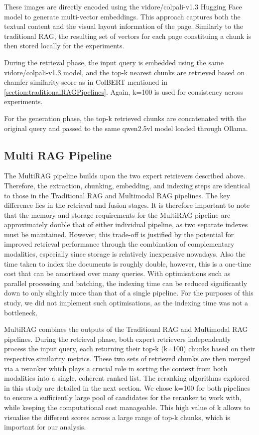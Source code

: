 \documentclass[12pt,twoside]{report}
\begin{document}
These images are directly encoded using the vidore/colpali-v1.3 Hugging Face model to generate multi-vector embeddings.\cite{VidoreColPali} This approach captures both the textual content and the visual layout information of the page. Similarly to the traditional RAG, the resulting set of vectors for each page constituing a chunk is then stored locally for the experiments.

During the retrieval phase, the input query is embedded using the same vidore/colpali-v1.3 model, and the top-k nearest chunks are retrieved based on chamfer similarity score as in ColBERT mentioned in \ref{section:traditionalRAGPipelines}.
Again, k=100 is used for consistency across experiments.

For the generation phase, the top-k retrieved chunks are concatenated with the original query and passed to the same qwen2.5vl model loaded through Ollama.

\subsection{Multi RAG Pipeline}

The MultiRAG pipeline builds upon the two expert retrievers described above. Therefore, the extraction, chunking, embedding, and indexing steps are identical to those in the Traditional RAG and Multimodal RAG pipelines. The key difference lies in the retrieval and fusion stages. It is therefore important to note that the memory and storage requirements for the MultiRAG pipeline are approximately double that of either individual pipeline, as two separate indexes must be maintained. However, this trade-off is justified by the potential for improved retrieval performance through the combination of complementary modalities, especially since storage is relatively inexpensive nowadays. Also the time taken to index the documents is roughly double, however, this is a one-time cost that can be amortised over many queries. With optimisations such as parallel processing and batching, the indexing time can be reduced significantly down to only slightly more than that of a single pipeline. For the purposes of this study, we did not implement such optimisations, as the indexing time was not a bottleneck.

MultiRAG combines the outputs of the Traditional RAG and Multimodal RAG pipelines. During the retrieval phase, both expert retrievers independently process the input query, each returning their top-k (k=100) chunks based on their respective similarity metrics. These two sets of retrieved chunks are then merged via a reranker which plays a crucial role in sorting the context from both modalities into a single, coherent ranked list. The reranking algorithms explored in this study are detailed in the next section. We chose k=100 for both pipelines to ensure a sufficiently large pool of candidates for the reranker to work with, while keeping the computational cost manageable. This high value of k allows to visualise the different scores across a large range of top-k chunks, which is important for our analysis.
\end{document}
